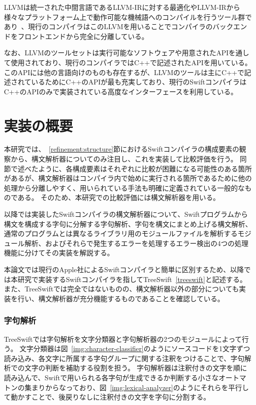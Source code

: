 LLVMは統一された中間言語であるLLVM-IRに対する最適化やLLVM-IRから様々なプラットフォーム上で動作可能な機械語へのコンパイルを行うツール群であり~\cite{llvm}、現行のコンパイラはこのLLVMを用いることでコンパイラのバックエンドをフロントエンドから完全に分離している。

なお、LLVMのツールセットは実行可能なソフトウェアや用意されたAPIを通して使用されており、現行のコンパイラではC++で記述されたAPIを用いている。
このAPIには他の言語向けのものも存在するが、LLVMのツールは主にC++で記述されているためにC++のAPIが最も充実しており、現行のSwiftコンパイラはC++のAPIのみで実装されている高度なインターフェースを利用している。

\section{実装の概要}
\label{implementation:abstract}

本研究では、~\ref{refinement:structure}節におけるSwiftコンパイラの構成要素の観察から、構文解析器についてのみ注目し、これを実装して比較評価を行う。
同節で述べたように、各構成要素はそれぞれに比較が困難になる可能性のある箇所があるが、構文解析器はコンパイラ内で始めに実行される箇所であるために他の処理から分離しやすく、用いられている手法も明確に定義されている一般的なものである。
そのため、本研究での比較評価には構文解析器を用いる。

以降では実装したSwiftコンパイラの構文解析器について、Swiftプログラムから構文を構成する字句に分解する字句解析、字句を構文にまとめ上げる構文解析、通常のプログラムとは異なるライブラリ用のモジュールファイルを解析するモジュール解析、およびそれらで発生するエラーを処理するエラー検出の4つの処理機能に分けてその実装を解説する。

本論文では現行のApple社によるSwiftコンパイラと簡単に区別するため、以降では本研究で実装するSwiftコンパイラを指してTreeSwift~\ref{treeswift}と記述する。
また、TreeSwiftでは完全ではないものの、構文解析器以外の部分についても実装を行い、構文解析器が充分機能するものであることを確認している。

\subsubsection{字句解析}

TreeSwiftでは字句解析を文字分類器と字句解析器の2つのモジュールによって行う。
文字分類器は図~\ref{img:character-classifier}のようにソースコードを1文字ずつ読み込み、各文字に所属する字句グループに関する注釈をつけることで、字句解析での文字の判断を補助する役割を担う。
字句解析器は注釈付きの文字を順に読み込んで、Swiftで用いられる各字句が生成できるか判断する小さなオートマトンの集まりからなっており、図~\ref{img:lexical-analyzer}のようにそれらを平行して動かすことで、後戻りなしに注釈付きの文字を字句に分割する。


